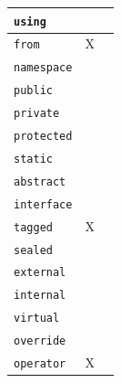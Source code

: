 \documentclass{article}
\begin{document}
\begin{table}[H]
\begin{tabular}{|l|c|p{}|}
	\texttt{using} & & \\ \hline
	\texttt{from} & X & \\ \hline
	\texttt{namespace} & & \\ \hline
	\texttt{public} & &  \\ \hline
	\texttt{private} & & \\ \hline
	\texttt{protected} & & \\ \hline
	\texttt{static} & &  \\ \hline
	\texttt{abstract} & & \\ \hline
	\texttt{interface} & & \\ \hline
	\texttt{tagged} & X &  \\ \hline
	\texttt{sealed} & & \\ \hline
	\texttt{external} & & \\ \hline
	\texttt{internal} & &  \\ \hline
	\texttt{virtual} & & \\ \hline
	\texttt{override} & &  \\ \hline
	\texttt{operator} & X &  \\ \hline
	\end{tabular}
\end{table}
\end{document}
